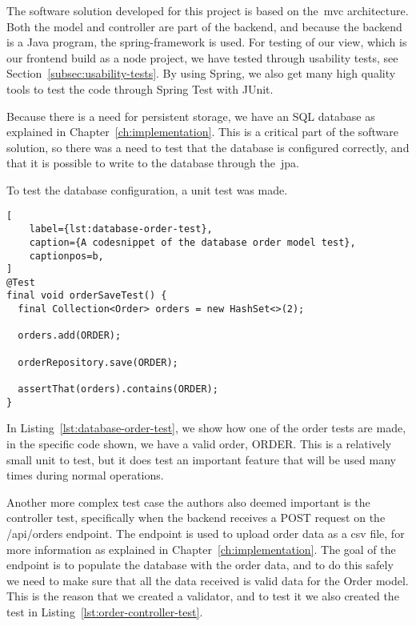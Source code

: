 The software solution developed for this project is based on the~\acrfull{mvc} architecture.
Both the model and controller are part of the backend, and because the backend is a Java program,
the spring-framework is used.
For testing of our view, which is our frontend build as a node project, we have tested through usability tests,
see Section~\ref{subsec:usability-tests}.
By using Spring, we also get many high quality tools to test the code through Spring Test with JUnit.

Because there is a need for persistent storage, we have an SQL database as explained in Chapter~\ref{ch:implementation}.
This is a critical part of the software solution, so there was a need to test that the database is configured
correctly, and that it is possible to write to the database through the~\acrfull{jpa}.

To test the database configuration, a unit test was made.
\begin{lstlisting}[
    label={lst:database-order-test},
    caption={A codesnippet of the database order model test},
    captionpos=b,
]
@Test
final void orderSaveTest() {
  final Collection<Order> orders = new HashSet<>(2);

  orders.add(ORDER);

  orderRepository.save(ORDER);

  assertThat(orders).contains(ORDER);
}
\end{lstlisting}

In Listing~\ref{lst:database-order-test}, we show how one of the order tests are made, in the specific code shown,
we have a valid order, ORDER\@.
This is a relatively small unit to test, but it does test an important feature that will be used many times
during normal operations.

Another more complex test case the authors also deemed important is the controller test, specifically when
the backend receives a POST request on the /api/orders endpoint.
The endpoint is used to upload order data as a csv file, for more information as explained in
Chapter~\ref{ch:implementation}.
The goal of the endpoint is to populate the database with the order data, and to do this safely we need
to make sure that all the data received is valid data for the Order model.
This is the reason that we created a validator, and to test it we also created the test in
Listing~\ref{lst:order-controller-test}.

